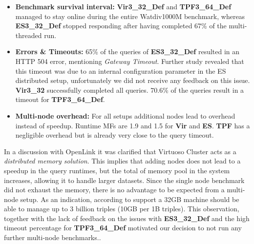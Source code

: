 \begin{itemize}
	\item \textbf{Benchmark survival interval:} %
	\textbf{Vir3\_32\_Def} and \textbf{TPF3\_64\_Def} managed to stay online during the entire Watdiv1000M benchmark, whereas \textbf{ES3\_32\_Def} stopped responding after having completed 67\% of the multi-threaded run. 
	\item \textbf{Errors \& Timeouts:} 65\% of the queries of \textbf{ES3\_32\_Def} resulted in an HTTP 504 error, mentioning \textit{Gateway Timeout}. Further study revealed that this timeout was due to an internal configuration parameter in the ES distributed setup, unfortunately we did not receive any feedback on this issue. \textbf{Vir3\_32} successfully completed all queries. 70.6\% of the queries result in a timeout for \textbf{TPF3\_64\_Def}.
	\item \textbf{Multi-node overhead:} For all setups additional nodes lead to overhead instead of speedup. Runtime MFs are 1.9 and 1.5 for \textbf{Vir} and \textbf{ES}. \textbf{TPF} has a negligible overhead but is already very close to the query timeout.
\end{itemize}
%
%   

In a discussion with OpenLink it was clarified that Virtuoso Cluster acts as a \emph{distributed memory solution}. This implies that adding nodes does not lead to a speedup in the query runtimes, but the total of memory pool in the system increases, allowing it to handle larger datasets. Since the single node benchmark did not exhaust the memory, there is no advantage to be expected from a multi-node setup. As an indication, according to support a 32GB machine should be able to manage up to 3 billion triples (10GB per 1B triples). 
This observation, together with the lack of feedback on the issues with \textbf{ES3\_32\_Def} and the high timeout percentage for \textbf{TPF3\_64\_Def} motivated our decision to not run any further multi-node benchmarks..

